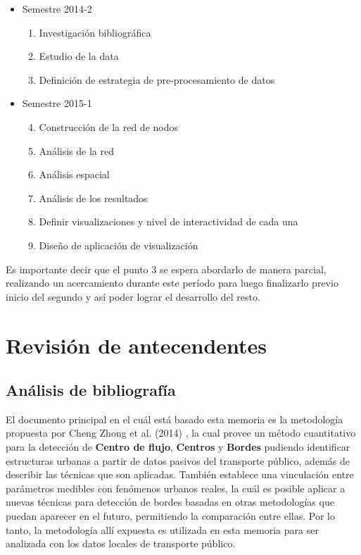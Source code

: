 \documentclass[12pt]{article}
\begin{document}
    \begin{itemize}
    \item Semestre 2014-2
    \begin{enumerate}
    \item Investigación bibliográfica 
    \item Estudio de la data
    \item Definición de estrategia de pre-procesamiento de datos
    \end{enumerate}
    \item Semestre 2015-1
    \begin{enumerate}\setcounter{enumi}{3}
    \item Construcción de la red de nodos
    \item Análisis de la red
    \item Análisis espacial
    \item Análisis de los resultados
    \item Definir visualizaciones y nivel de interactividad de cada una
    \item Diseño de aplicación de visualización
    \end{enumerate}
    \end{itemize}

    Es importante decir que el punto 3 se espera abordarlo de manera parcial, realizando un acercamiento durante este período para luego finalizarlo previo inicio del segundo y así poder lograr el desarrollo del resto.


    \newpage

    \section{Revisión de antecendentes}
    
    \subsection{Análisis de bibliografía}\label{sec:Analisis_bibliografia}
    
    El documento principal en el cuál está basado esta memoria es la metodología propuesta por Cheng Zhong et al. (2014) \cite{Estructura_urbana}, la cual provee un método cuantitativo para la detección de \textbf{Centro de flujo}, \textbf{Centros} y \textbf{Bordes} pudiendo identificar estructuras urbanas a partir de datos pasivos del transporte público, además de describir las técnicas que son aplicadas. También establece una vinculación entre parámetros medibles con fenómenos urbanos reales, la cuál es posible aplicar a nuevas técnicas para detección de bordes basadas en otras metodologías que puedan aparecer en el futuro, permitiendo la comparación entre ellas. Por lo tanto, la metodología allí expuesta es utilizada en esta memoria para ser analizada con los datos locales de transporte público.
    
\end{document}
